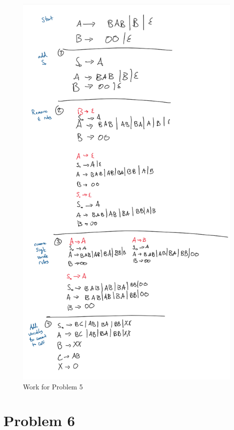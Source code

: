 \documentclass[11pt]{article}
\begin{document}
\begin{figure}[h!]
	\centering
	\includegraphics[scale=0.9]{problem5.png} 
	\caption{Work for Problem 5}
\end{figure}

\newpage
\section*{Problem 6}
\end{document}
